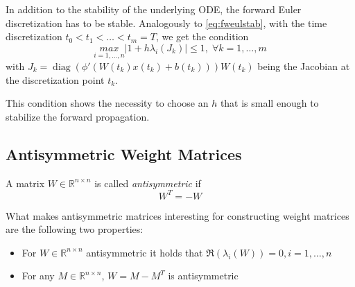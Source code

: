 \documentclass[a4paper, 12pt]{scrreprt} %
\DeclareMathOperator*{\diag}{diag}
\begin{document}
\iffalse It follows that the weight-matrix $W(t)$ changing sufficiently slow and  
\begin{equation}
\underset{i=1,\dots,n}{max}\Re(\lambda_i(W(t))) \leq 0, \hspace{0.5cm}\forall t \in [t_0,T]
\label{eq:wstab}
\end{equation}
are sufficient for the weak stability criterion to hold.\newline
\fi

In addition to the stability of the underlying \ac{ODE}, the forward Euler discretization has to be stable. Analogously to \ref{eq:fweulstab}, with the time discretization $t_0 < t_1 < \dots < t_m = T$, we get the condition
\begin{equation}
\underset{i=1,\dots,n}{max} \vert 1+h\lambda_i(J_k) \vert \leq 1,\; \forall k=1,\dots,m
\label{eq:eulstab}
\end{equation}
with $J_k = \diag(\phi'(W(t_k) x(t_k) + b(t_k))) W(t_k)$ being the Jacobian at the discretization point $t_k$.

This condition shows the necessity to choose an $h$ that is small enough to stabilize the forward propagation.%


\subsection{Antisymmetric Weight Matrices} 

\begin{definition}
A matrix $W \in \mathbb{R}^{n\times n}$ is called \emph{antisymmetric} if
\begin{equation*}
W^T = -W
\end{equation*}
\end{definition}

What makes antisymmetric matrices interesting for constructing weight matrices are the following two properties:

\begin{itemize}
	\item For $W \in \mathbb{R}^{n\times n}$ antisymmetric it holds that $\Re(\lambda_i(W)) = 0, i=1,\dots,n$
	\item For any $M \in \mathbb{R}^{n\times n}$, $W = M-M^T$ is antisymmetric
\end{itemize}
\end{document}
